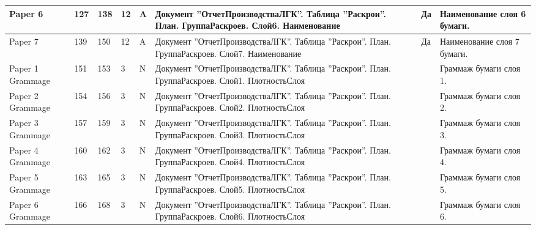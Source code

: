 \begin{landscape}
\begin{longtable}{|p{25mm}|p{6mm}|p{6mm}|p{8mm}|p{6mm}|p{60mm}|p{12mm}|p{100mm}|}
\hline
\parbox[c][20mm]{25mm}{Paper 6} & \parbox{10mm}{127} & \parbox{10mm}{138} & \parbox{10mm}{12} & \parbox{10mm}{A} & \parbox{49mm}{Документ ''ОтчетПроизводстваЛГК''. Таблица ''Раскрои''. План. ГруппаРаскроев. Слой6. Наименование} & \parbox{11mm}{Да} & \parbox{89mm}{Наименование слоя 6 бумаги.} \\
\hline
\parbox[c][20mm]{25mm}{Paper 7} & \parbox{10mm}{139} & \parbox{10mm}{150} & \parbox{10mm}{12} & \parbox{10mm}{A} & \parbox{49mm}{Документ ''ОтчетПроизводстваЛГК''. Таблица ''Раскрои''. План. ГруппаРаскроев. Слой7. Наименование} & \parbox{11mm}{Да} & \parbox{89mm}{Наименование слоя 7 бумаги.} \\
\hline
\parbox[c][20mm]{25mm}{Paper 1 Grammage} & \parbox{10mm}{151} & \parbox{10mm}{153} & \parbox{10mm}{3} & \parbox{10mm}{N} & \parbox{49mm}{Документ ''ОтчетПроизводстваЛГК''. Таблица ''Раскрои''. План. ГруппаРаскроев. Слой1. ПлотностьСлоя} & \parbox{11mm}{} & \parbox{89mm}{Граммаж бумаги слоя 1.} \\
\hline
\parbox[c][20mm]{25mm}{Paper 2 Grammage} & \parbox{10mm}{154} & \parbox{10mm}{156} & \parbox{10mm}{3} & \parbox{10mm}{N} & \parbox{49mm}{Документ ''ОтчетПроизводстваЛГК''. Таблица ''Раскрои''. План. ГруппаРаскроев. Слой2. ПлотностьСлоя} & \parbox{11mm}{} & \parbox{89mm}{Граммаж бумаги слоя 2.} \\
\hline
\parbox[c][20mm]{25mm}{Paper 3 Grammage} & \parbox{10mm}{157} & \parbox{10mm}{159} & \parbox{10mm}{3} & \parbox{10mm}{N} & \parbox{49mm}{Документ ''ОтчетПроизводстваЛГК''. Таблица ''Раскрои''. План. ГруппаРаскроев. Слой3. ПлотностьСлоя} & \parbox{11mm}{} & \parbox{89mm}{Граммаж бумаги слоя 3.} \\
\hline
\parbox[c][20mm]{25mm}{Paper 4 Grammage} & \parbox{10mm}{160} & \parbox{10mm}{162} & \parbox{10mm}{3} & \parbox{10mm}{N} & \parbox{49mm}{Документ ''ОтчетПроизводстваЛГК''. Таблица ''Раскрои''. План. ГруппаРаскроев. Слой4. ПлотностьСлоя} & \parbox{11mm}{} & \parbox{89mm}{Граммаж бумаги слоя 4.} \\
\hline
\parbox[c][20mm]{25mm}{Paper 5 Grammage} & \parbox{10mm}{163} & \parbox{10mm}{165} & \parbox{10mm}{3} & \parbox{10mm}{N} & \parbox{49mm}{Документ ''ОтчетПроизводстваЛГК''. Таблица ''Раскрои''. План. ГруппаРаскроев. Слой5. ПлотностьСлоя} & \parbox{11mm}{} & \parbox{89mm}{Граммаж бумаги слоя 5.} \\
\hline
\parbox[c][20mm]{25mm}{Paper 6 Grammage} & \parbox{10mm}{166} & \parbox{10mm}{168} & \parbox{10mm}{3} & \parbox{10mm}{N} & \parbox{49mm}{Документ ''ОтчетПроизводстваЛГК''. Таблица ''Раскрои''. План. ГруппаРаскроев. Слой6. ПлотностьСлоя} & \parbox{11mm}{} & \parbox{89mm}{Граммаж бумаги слоя 6.} \\

\end{longtable}
\end{landscape}
